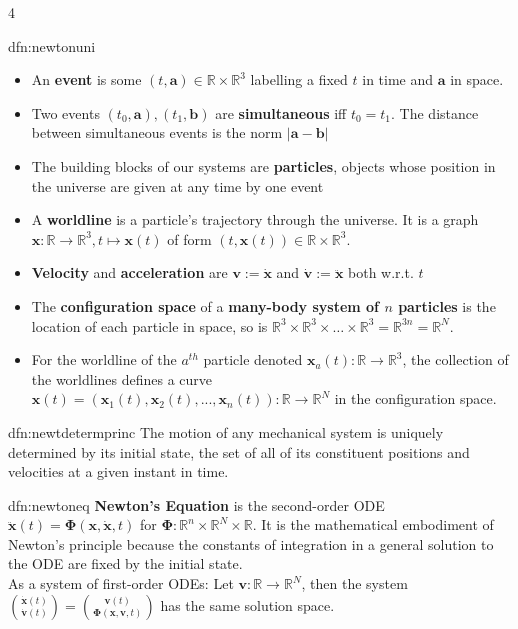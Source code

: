 \documentclass[landscape, 8pt]{extarticle}
\begin{document}
\begin{multicols*}{4}
		
		\begin{dfn}{dfn:newtonuni}{ }
			\begin{itemize}
				\item An \textbf{event} is some $(t, \bm{a})\in \mathbb{R} \times \mathbb{R}^3$ labelling a fixed $t$ in time and $\bm{a}$ in space.
				\item Two events $(t_0, \bm{a}), (t_1, \bm{b})$ are \textbf{simultaneous} iff $t_0 = t_1$. The distance between simultaneous events is the norm $\left|\bm{a} - \bm{b}\right|$
				\item The building blocks of our systems are \textbf{particles}, objects whose position in the universe are given at any time by one event
				\item A \textbf{worldline} is a particle's trajectory through the universe. It is a graph $\bm{x} : \mathbb{R} \to \mathbb{R}^3, t \mapsto\bm{x}(t)$ of form $(t, \bm{x}(t))\in \mathbb{R} \times \mathbb{R}^3$.
				\item \textbf{Velocity} and \textbf{acceleration} are $\bm{v} := \bm{\dot{x}}$ and $\bm{\dot{v}} := \bm{\ddot{x}}$ both w.r.t. $t$
				\item The \textbf{configuration space} of a \textbf{many-body system of $n$ particles} is the location of each particle in space, so is $\mathbb{R}^3 \times \mathbb{R}^3 \times \dots \times \mathbb{R}^3 = \mathbb{R}^{3n} = \mathbb{R}^N$.
				\item For the worldline of the $a^{th}$ particle denoted $\bm{x}_a(t): \mathbb{R} \to \mathbb{R}^3$, the collection of the worldlines defines a curve $\bm{x}(t) = (\bm{x}_1(t), \bm{x}_2(t), ..., \bm{x}_n(t)): \mathbb{R} \to \mathbb{R}^N$ in the configuration space.
			\end{itemize}
			
		\end{dfn}
		
		
		\begin{dfn}{dfn:newtdetermprinc}{ }
			The motion of any mechanical system is uniquely determined by its initial state, the set of all of its constituent positions and velocities at a given instant in time. 
			
		\end{dfn}
		
		
		\begin{mdfn}{dfn:newtoneq}{ }
			\textbf{Newton's Equation} is the second-order ODE $\bm{\ddot{x}}(t) = \bm{\Phi}(\bm{x}, \bm{\dot{x}}, t)$ for $\bm{\Phi} : \mathbb{R}^n \times \mathbb{R}^N \times \mathbb{R}$. It is the mathematical embodiment of Newton's principle because the constants of integration in a general solution to the ODE are fixed by the initial state.\\
			As a system of first-order ODEs: Let $\bm{v} : \mathbb{R} \to \mathbb{R}^N$, then the system $\binom{\bm{\dot{x}}(t)}{\bm{\dot{v}}(t)} = \binom{\bm{v}(t)}{\bm{\Phi}(\bm{x}, \bm{v}, t)}$ has the same solution space.
			

\end{mdfn}
\end{multicols*}
\end{document}
